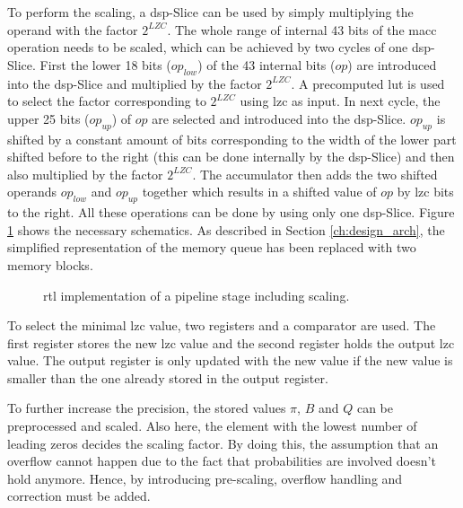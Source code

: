 \documentclass[mscthesis]{usiinfthesis}
\begin{document}
To perform the scaling, a \gls{dsp}-Slice can be used by simply multiplying the
operand with the factor $2^{LZC}$. The whole range of internal 43 bits of the
\gls{macc} operation needs to be scaled, which can be achieved by two cycles of
one \gls{dsp}-Slice. First the lower 18 bits ($op_{low}$) of the 43 internal
bits ($op$) are introduced into the \gls{dsp}-Slice and multiplied by the
factor $2^{LZC}$. A precomputed \gls{lut} is used to select the factor
corresponding to $2^{LZC}$ using \gls{lzc} as input. In next cycle, the upper
25 bits ($op_{up}$) of $op$ are selected and introduced into the
\gls{dsp}-Slice. $op_{up}$ is shifted by a constant amount of bits
corresponding to the width of the lower part shifted before to the right (this
can be done internally by the \gls{dsp}-Slice) and then also multiplied by the
factor $2^{LZC}$. The accumulator then adds the two shifted operands $op_{low}$
and $op_{up}$ together which results in a shifted value of $op$ by \gls{lzc}
bits to the right. All these operations can be done by using only one
\gls{dsp}-Slice.  Figure \ref{fig:arch_step_scale} shows the necessary
schematics. As described in Section \ref{ch:design_arch}, the simplified
representation of the memory queue has been replaced with two memory blocks.

\begin{figure}
    \centering
    
    \caption{\acrshort{rtl} implementation of a pipeline stage including
        scaling.}
    \label{fig:arch_step_scale}
\end{figure}

To select the minimal \gls{lzc} value, two registers and a comparator are used.
The first register stores the new \gls{lzc} value and the second register holds
the output \gls{lzc} value. The output register is only updated with the new
value if the new value is smaller than the one already stored in the output
register.

To further increase the precision, the stored values $\pi$, $B$ and $Q$ can be
preprocessed and scaled. Also here, the element with the lowest number of
leading zeros decides the scaling factor. By doing this, the assumption that an
overflow cannot happen due to the fact that probabilities are involved doesn't
hold anymore. Hence, by introducing pre-scaling, overflow handling and
correction must be added.

\end{document}
